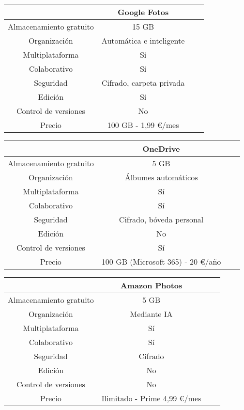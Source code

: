 \begin{tabular}{| c | c | c | c |}
    \hline
    \cellcolor[HTML]{4285F3} & Google Fotos\\ 
    \hline
    Almacenamiento gratuito & 15 GB \\
    \hline
    Organización & Automática e inteligente \\
    \hline
    Multiplataforma & Sí \\
    \hline
    Colaborativo & Sí \\
    \hline
    Seguridad & Cifrado, carpeta privada \\
    \hline
    Edición & Sí \\
    \hline
    Control de versiones & No \\
    \hline
    Precio & 100 GB - 1,99 €/mes \\
    \hline
\end{tabular}

\vspace{1cm} %

\begin{tabular}{| c | c | c | c |}
    \hline
        \cellcolor[HTML]{24a0e8} & OneDrive\\ 
    \hline
    Almacenamiento gratuito & 5 GB \\
    \hline
    Organización & Álbumes automáticos \\
    \hline
    Multiplataforma & Sí \\
    \hline
    Colaborativo & Sí \\
    \hline
    Seguridad & Cifrado, bóveda personal \\
    \hline
    Edición & No \\
    \hline
    Control de versiones & Sí \\
    \hline
    Precio & 100 GB (Microsoft 365) - 20 €/año \\
    \hline
\end{tabular}

\vspace{1cm} %

\begin{tabular}{| c | c | c | c |}
    \hline
        \cellcolor[HTML]{00464f}& Amazon Photos\\ 
    \hline
    Almacenamiento gratuito & 5 GB \\
    \hline
    Organización & Mediante IA \\
    \hline
    Multiplataforma & Sí \\
    \hline
    Colaborativo & Sí \\
    \hline
    Seguridad & Cifrado \\
    \hline
    Edición & No \\
    \hline
    Control de versiones & No \\
    \hline
    Precio & Ilimitado - Prime 4,99 €/mes \\
    \hline
\end{tabular}

